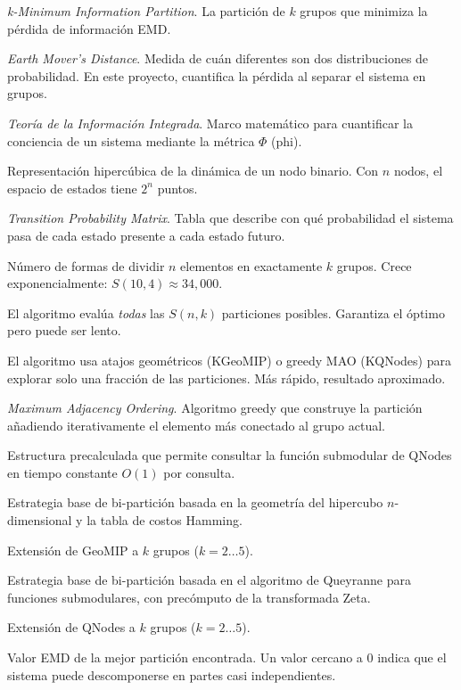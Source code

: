 \begin{description}[leftmargin=3cm, style=nextline]
    \item[\textbf{k-MIP}] \textit{k-Minimum Information Partition}. La partición de $k$ grupos que minimiza la pérdida de información EMD.
    \item[\textbf{EMD}] \textit{Earth Mover's Distance}. Medida de cuán diferentes son dos distribuciones de probabilidad. En este proyecto, cuantifica la pérdida al separar el sistema en grupos.
    \item[\textbf{IIT}] \textit{Teoría de la Información Integrada}. Marco matemático para cuantificar la conciencia de un sistema mediante la métrica $\Phi$ (phi).
    \item[\textbf{N-Cubo}] Representación hipercúbica de la dinámica de un nodo binario. Con $n$ nodos, el espacio de estados tiene $2^n$ puntos.
    \item[\textbf{TPM}] \textit{Transition Probability Matrix}. Tabla que describe con qué probabilidad el sistema pasa de cada estado presente a cada estado futuro.
    \item[\textbf{Stirling $S(n,k)$}] Número de formas de dividir $n$ elementos en exactamente $k$ grupos. Crece exponencialmente: $S(10,4) \approx 34{,}000$.
    \item[\textbf{Modo exacto}] El algoritmo evalúa \textit{todas} las $S(n,k)$ particiones posibles. Garantiza el óptimo pero puede ser lento.
    \item[\textbf{Modo heurístico}] El algoritmo usa atajos geométricos (KGeoMIP) o greedy MAO (KQNodes) para explorar solo una fracción de las particiones. Más rápido, resultado aproximado.
    \item[\textbf{MAO}] \textit{Maximum Adjacency Ordering}. Algoritmo greedy que construye la partición añadiendo iterativamente el elemento más conectado al grupo actual.
    \item[\textbf{Oráculo Zeta}] Estructura precalculada que permite consultar la función submodular de QNodes en tiempo constante $O(1)$ por consulta.
    \item[\textbf{GeoMIP}] Estrategia base de bi-partición basada en la geometría del hipercubo $n$-dimensional y la tabla de costos Hamming.
    \item[\textbf{KGeoMIP}] Extensión de GeoMIP a $k$ grupos ($k = 2 \ldots 5$).
    \item[\textbf{QNodes}] Estrategia base de bi-partición basada en el algoritmo de Queyranne para funciones submodulares, con precómputo de la transformada Zeta.
    \item[\textbf{KQNodes}] Extensión de QNodes a $k$ grupos ($k = 2 \ldots 5$).
    \item[\textbf{Pérdida (loss)}] Valor EMD de la mejor partición encontrada. Un valor cercano a 0 indica que el sistema puede descomponerse en partes casi independientes.
\end{description}

